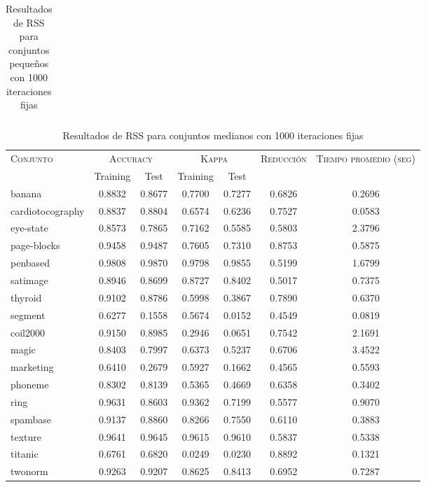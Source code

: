\begin{table}[]
\begin{tabular}{l c c c c c c}
\hline
\end{tabular}
\caption{Resultados de RSS para conjuntos pequeños con 1000 iteraciones fijas}
\label{res-peq-RSS}
\end{table}

\begin{table}[]
\centering
\begin{tabular}{l c c c c c c}
\hline
\multirow{2}{*}{\textsc{Conjunto}}
	& \multicolumn{2}{c}{\textsc{Accuracy}}
	& \multicolumn{2}{c}{\textsc{Kappa}}
	& \textsc{Reducción}
	& \textsc{Tiempo promedio (seg)} \\
	& Training & Test
	& Training & Test \\ 
\hline
\hline

banana & 0.8832 & 0.8677 & 0.7700 & 0.7277 & 0.6826 & 0.2696 \\
cardiotocography & 0.8837 & 0.8804 & 0.6574 & 0.6236 & 0.7527 & 0.0583 \\
eye-state & 0.8573 & 0.7865 & 0.7162 & 0.5585 & 0.5803 & 2.3796 \\
page-blocks & 0.9458 & 0.9487 & 0.7605 & 0.7310 & 0.8753 & 0.5875 \\
penbased & 0.9808 & 0.9870 & 0.9798 & 0.9855 & 0.5199 & 1.6799 \\
satimage & 0.8946 & 0.8699 & 0.8727 & 0.8402 & 0.5017 & 0.7375 \\
thyroid & 0.9102 & 0.8786 & 0.5998 & 0.3867 & 0.7890 & 0.6370 \\
segment & 0.6277 & 0.1558 & 0.5674 & 0.0152 & 0.4549 & 0.0819 \\
coil2000 & 0.9150 & 0.8985 & 0.2946 & 0.0651 & 0.7542 & 2.1691 \\
magic & 0.8403 & 0.7997 & 0.6373 & 0.5237 & 0.6706 & 3.4522 \\
marketing & 0.6410 & 0.2679 & 0.5927 & 0.1662 & 0.4565 & 0.5593 \\
phoneme & 0.8302 & 0.8139 & 0.5365 & 0.4669 & 0.6358 & 0.3402 \\
ring & 0.9631 & 0.8603 & 0.9362 & 0.7199 & 0.5577 & 0.9070 \\
spambase & 0.9137 & 0.8860 & 0.8266 & 0.7550 & 0.6110 & 0.3883 \\
texture & 0.9641 & 0.9645 & 0.9615 & 0.9610 & 0.5837 & 0.5338 \\
titanic & 0.6761 & 0.6820 & 0.0249 & 0.0230 & 0.8892 & 0.1321 \\
twonorm & 0.9263 & 0.9207 & 0.8625 & 0.8413 & 0.6952 & 0.7287 \\

\hline
\end{tabular}
\caption{Resultados de RSS para conjuntos medianos con 1000 iteraciones fijas}
\label{res-med-RSS}
\end{table}

